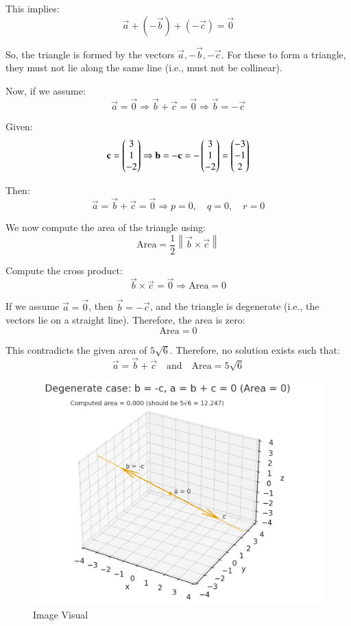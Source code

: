 \documentclass[journal]{IEEEtran}
\begin{document}
This implies:
\begin{equation}
\vec{a} + (-\vec{b}) + (-\vec{c}) = \vec{0}
\end{equation}

So, the triangle is formed by the vectors $\vec{a}, -\vec{b}, -\vec{c}$. For these to form a triangle, they must not lie along the same line (i.e., must not be collinear).

\vspace{1em}
Now, if we assume:
\begin{equation}
\vec{a} = \vec{0}
\Rightarrow \vec{b} + \vec{c} = \vec{0}
\Rightarrow \vec{b} = -\vec{c}
\end{equation}

Given:
\begin{equation}
\mathbf{c} = \begin{pmatrix}3 \\ 1 \\ -2\end{pmatrix} 
\Rightarrow \mathbf{b} = -\mathbf{c} = -\begin{pmatrix}3 \\ 1 \\ -2\end{pmatrix}
= \begin{pmatrix}-3 \\ -1 \\ 2\end{pmatrix}
\end{equation}

Then:
\begin{equation}
\vec{a} = \vec{b} + \vec{c} = \vec{0}
\Rightarrow p = 0,\quad q = 0,\quad r = 0
\end{equation}

We now compute the area of the triangle using:
\begin{equation}
\text{Area} = \frac{1}{2} \left\| \vec{b} \times \vec{c} \right\|
\end{equation}

Compute the cross product:
\begin{equation}
\vec{b} \times \vec{c} = \vec{0} \Rightarrow \text{Area} = 0
\end{equation}

If we assume $\vec{a} = \vec{0}$, then $\vec{b} = -\vec{c}$, and the triangle is degenerate (i.e., the vectors lie on a straight line). Therefore, the area is zero:
\begin{equation}
\boxed{\text{Area} = 0}
\end{equation}

This contradicts the given area of $5\sqrt{6}$. Therefore, no solution exists such that:
\begin{equation}
\vec{a} = \vec{b} + \vec{c} \quad \text{and} \quad \text{Area} = 5\sqrt{6}
\end{equation}

\begin{figure}[H]
    \centering
    \includegraphics[width=0.75\linewidth]{figs/Screenshot 2025-09-13 191422.png}
    \caption{Image Visual}
    \label{fig:figs/Screenshot 2025-09-13 191422.png}
\end{figure}
\end{document}
